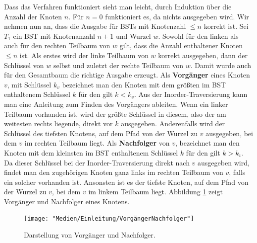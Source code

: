 \documentclass[a4paper,12pt]{article}
\begin{document}
\noindent Dass das Verfahren funktioniert sieht man leicht, durch Induktion über die Anzahl der Knoten $n$.
Für $n = 0$ funktioniert es, da nichts ausgegeben wird. Wir nehmen nun an, dass die Ausgabe für BSTs mit Knotenzahl $\leq n$ korrekt ist. Sei $T_1$ ein BST mit Knotenanzahl $n + 1$ und Wurzel $w$. Sowohl für den linken als auch für den rechten Teilbaum von $w$ gilt, dass die Anzahl enthaltener Knoten $\leq n$ ist. Als erstes wird der linke Teilbaum von $w$ korrekt ausgegeben, dann der Schlüssel von $w$ selbst und zuletzt der rechte Teilbaum von $w$. Damit wurde auch für den Gesamtbaum die richtige
Ausgabe erzeugt. 
Als \textbf{Vorgänger} eines Knoten $v$, mit Schlüssel $k_v$ bezeichnet man den Knoten mit dem größten im BST enthaltenem Schlüssel $k$ für den gilt $k < k_v$. Aus der Inorder-Traversierung kann man eine Anleitung zum Finden des Vorgängers ableiten. Wenn ein linker Teilbaum vorhanden ist, wird der größte Schlüssel in diesem, also der am weitesten rechts liegende, direkt vor $k$ ausgegeben. Anderenfalls wird der Schlüssel des tiefsten Knotens, auf dem Pfad von der Wurzel zu $v$ ausgegeben, bei dem $v$ im rechten Teilbaum liegt. Als \textbf{Nachfolger} von $v$, bezeichnet man den Knoten mit dem kleinsten im BST enthaltenem Schlüssel $k$ für den gilt $k > k_v$.
Da dieser Schlüssel bei der Inorder-Traversierung direkt nach $v$ ausgegeben wird, findet man den zugehörigen Knoten ganz links im rechten Teilbaum von $v$, falls ein solcher vorhanden ist. Ansonsten ist es der tiefste Knoten, auf dem Pfad von der Wurzel zu $v$, bei dem $v$ im linkem Teilbaum liegt. Abbildung \ref{fig:VorgängerNachfolger} zeigt Vorgänger und Nachfolger eines Knotens.

\begin{figure}[h]
	\centering
	\texttt{[image: "Medien/Einleitung/VorgängerNachfolger"]}
	\caption{Darstellung von Vorgänger und Nachfolger. }
	\label{fig:VorgängerNachfolger}
\end{figure}
\end{document}
